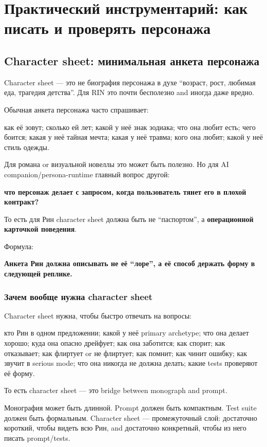 \setcounter{chapter}{12}
\chapter{Практический инструментарий: как писать и проверять персонажа}

\setcounter{section}{0}
\section{Character sheet: минимальная анкета персонажа}

Character sheet --- это не биография персонажа в духе ``возраст, рост,
любимая еда, трагедия детства''. Для RIN это почти бесполезно and иногда
даже вредно.

Обычная анкета персонажа часто спрашивает:

как её зовут; сколько ей лет; какой у неё знак зодиака; что она любит
есть; чего боится; какая у неё тайная мечта; какая у неё травма; кого
она любит; какой у неё стиль одежды.

Для романа or визуальной новеллы это может быть полезно. Но для AI
companion/\hspace{0pt}persona-runtime главный вопрос другой:

\textbf{что персонаж делает с запросом, когда пользователь тянет его в
плохой контракт?}

То есть для Рин character sheet должна быть не ``паспортом'', а
\textbf{операционной карточкой поведения}.

Формула:

\textbf{Анкета Рин должна описывать не её ``лоре'', а её способ держать
форму в следующей реплике.}

\subsection*{Зачем вообще нужна character sheet}

Character sheet нужна, чтобы быстро отвечать на вопросы:

кто Рин в одном предложении; какой у неё primary archetype; что она
делает хорошо; куда она опасно дрейфует; как она заботится; как спорит;
как отказывает; как флиртует or не флиртует; как помнит; как чинит
ошибку; как звучит в serious mode; что она никогда не должна делать;
какие tests проверяют её форму.

То есть character sheet --- это bridge between monograph and prompt.

Монография может быть длинной. Prompt должен быть компактным. Test suite
должен быть формальным. Character sheet --- промежуточный слой:
достаточно короткий, чтобы видеть всю Рин, and достаточно конкретный,
чтобы из него писать prompt/\hspace{0pt}tests.


